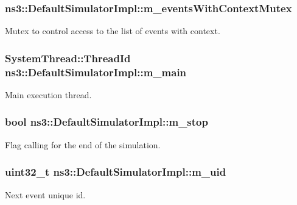 \subsubsection[{\texorpdfstring{m\+\_\+events\+With\+Context\+Mutex}{m_eventsWithContextMutex}}]{ ns3\+::\+Default\+Simulator\+Impl\+::m\+\_\+events\+With\+Context\+Mutex\hspace{0.3cm}{\ttfamily [private]}}\hypertarget{classns3_1_1DefaultSimulatorImpl_a121da8c24078574aa64f0d5a2f47a462}{}\label{classns3_1_1DefaultSimulatorImpl_a121da8c24078574aa64f0d5a2f47a462}
Mutex to control access to the list of events with context. 
\subsubsection[{\texorpdfstring{m\+\_\+main}{m_main}}]{\setlength{\rightskip}{0pt plus 5cm}System\+Thread\+::\+Thread\+Id ns3\+::\+Default\+Simulator\+Impl\+::m\+\_\+main\hspace{0.3cm}{\ttfamily [private]}}\hypertarget{classns3_1_1DefaultSimulatorImpl_ab9fa0ea2495d120f6537699c1dd8784f}{}\label{classns3_1_1DefaultSimulatorImpl_ab9fa0ea2495d120f6537699c1dd8784f}
Main execution thread. 
\subsubsection[{\texorpdfstring{m\+\_\+stop}{m_stop}}]{\setlength{\rightskip}{0pt plus 5cm}bool ns3\+::\+Default\+Simulator\+Impl\+::m\+\_\+stop\hspace{0.3cm}{\ttfamily [private]}}\hypertarget{classns3_1_1DefaultSimulatorImpl_a070bd3c9f757f4923dbf0a59c065a5ff}{}\label{classns3_1_1DefaultSimulatorImpl_a070bd3c9f757f4923dbf0a59c065a5ff}
Flag calling for the end of the simulation. 
\subsubsection[{\texorpdfstring{m\+\_\+uid}{m_uid}}]{\setlength{\rightskip}{0pt plus 5cm}uint32\+\_\+t ns3\+::\+Default\+Simulator\+Impl\+::m\+\_\+uid\hspace{0.3cm}{\ttfamily [private]}}\hypertarget{classns3_1_1DefaultSimulatorImpl_acb71bb9d73f1819286d4a910ebd03fb4}{}\label{classns3_1_1DefaultSimulatorImpl_acb71bb9d73f1819286d4a910ebd03fb4}
Next event unique id. 
